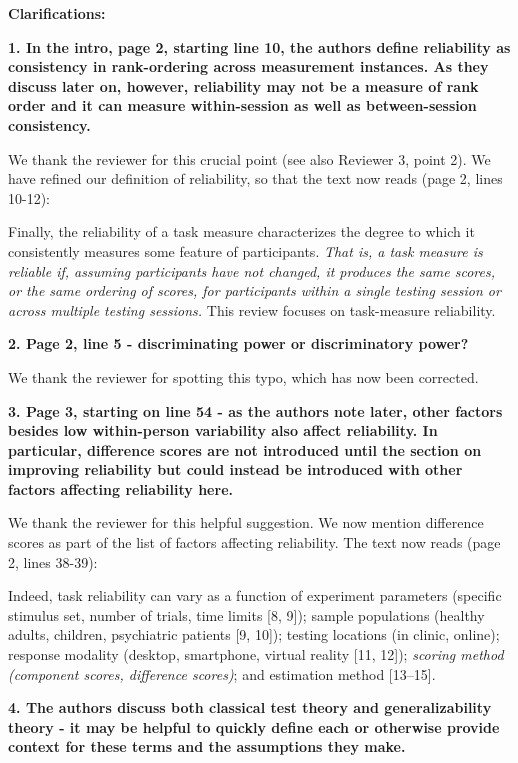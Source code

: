 \documentclass[a4paper,12pt]{article}
\begin{document}
\textbf{Clarifications:}

\textbf{1. In the intro, page 2, starting line 10, the authors define reliability as consistency in rank-ordering across measurement instances. As they discuss later on, however, reliability may not be a measure of rank order and it can measure within-session as well as between-session consistency.}

We thank the reviewer for this crucial point (see also Reviewer 3, point 2). We have refined our definition of reliability, so that the text now reads (page 2, lines 10-12):

\begin{displayquote}
    Finally, the reliability of a task measure characterizes the degree to which it consistently measures some feature of participants. \textit{That is, a task measure is reliable if, assuming participants have not changed, it produces the same scores, or the same ordering of scores, for participants within a single testing session or across multiple testing sessions.} This review focuses on task-measure reliability.
\end{displayquote}

\textbf{2. Page 2, line 5 - discriminating power or discriminatory power?}

We thank the reviewer for spotting this typo, which has now been corrected.

\textbf{3. Page 3, starting on line 54 - as the authors note later, other factors besides low within-person variability also affect reliability. In particular, difference scores are not introduced until the section on improving reliability but could instead be introduced with other factors affecting reliability here.}

We thank the reviewer for this helpful suggestion. We now mention difference scores as part of the list of factors affecting reliability. The text now reads (page 2, lines 38-39):

\begin{displayquote}
    Indeed, task reliability can vary as a function of experiment parameters (specific stimulus set, number of trials, time limits [8, 9]); sample populations (healthy adults, children, psychiatric patients [9, 10]); testing locations (in clinic, online); response modality (desktop, smartphone, virtual reality [11, 12]); \textit{scoring method (component scores, difference scores)}; and estimation method [13–15].
\end{displayquote}

\textbf{4. The authors discuss both classical test theory and generalizability theory - it may be helpful to quickly define each or otherwise provide context for these terms and the assumptions they make.}
\end{document}
